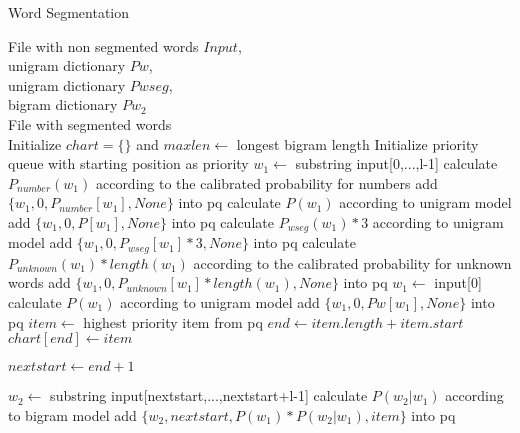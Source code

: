 \documentclass[11pt]{article}
\begin{document}
\begin{algorithm}[htb]
	\renewcommand{\algorithmicrequire}{\textbf{Input:}\hspace{10.7pt}}
	\renewcommand\algorithmicensure {\textbf{Output:} }
	\caption{Word Segmentation}
	\label{alg:pbg}
	\begin{algorithmic}[1]
		\REQUIRE File with non segmented words $Input$,\\
		unigram dictionary $Pw$,\\
		unigram dictionary $Pwseg$,\\
		bigram dictionary $Pw_2$\\ 
		\ENSURE File with segmented words \\
		\vspace{3pt}
		\STATE Initialize $chart=\{\}$ and $maxlen \gets $ longest bigram length
		\STATE Initialize priority queue with starting position as priority
		\STATE $w_1 \gets$ substring input[0,...,l-1]
		\STATE calculate $P_{number}(w_1)$ according to the calibrated probability for numbers
		\STATE add $\{w_1,0,P_{number}[w_1],None\}$ into pq
		\STATE calculate $P(w_1)$ according to unigram model 
		\STATE add $\{w_1,0,P[w_1],None\}$ into pq
		\STATE {}
		\STATE calculate $P_{wseg}(w_1) * 3$ according to unigram model 
		\STATE add $\{w_1,0,P_{wseg}[w_1] * 3,None\}$ into pq
		\ELSE
		\STATE {}
		\STATE calculate $P_{unknown}(w_1) * length(w_1)$ according to the calibrated probability for unknown words 
		\STATE add $\{w_1,0,P_{unknown}[w_1] * length(w_1),None\}$ into pq		
		\ENDIF
		\ENDFOR
		\STATE $w_1 \gets$ input[0]
		\STATE calculate $P(w_1)$ according to unigram model  
		\STATE add $\{w_1,0,Pw[w_1],None\}$ into pq
		\ENDIF
		\STATE $item \gets$ highest priority item from pq
		\STATE $end \gets item.length+item.start$ 
		\STATE $chart[end] \gets item$
		\ENDIF
		
		\STATE $nextstart \gets end+1$
		
		\STATE $w_2 \gets$ substring input[nextstart,...,nextstart+l-1] 
		\STATE calculate $P(w_2|w_1)$ according to bigram model 
		\STATE add $\{w_2,nextstart, P(w_1)*P(w_2|w_1),item\}$ into pq
		\ENDFOR
		

\end{algorithmic}
\end{algorithm}
\end{document}
